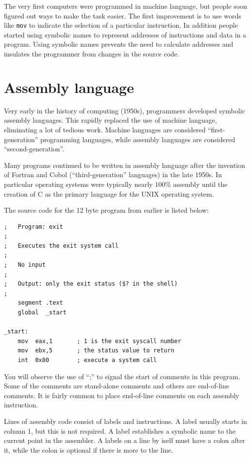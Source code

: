 \documentclass[11pt,b5paper]{book}
\begin{document}
The very first computers were programmed in machine language, but people
soon figured out ways to make the task easier.
The first improvement is to use words like {\tt mov} to indicate the selection of a particular instruction.
In addition people started using symbolic names to represent addresses of instructions and data in a program.
Using symbolic names prevents the need to calculate addresses and insulates the programmer from changes in the source code.

\section{Assembly language}

Very early in the history of computing (1950s), programmers developed symbolic
assembly languages.
This rapidly replaced the use of machine language, eliminating a lot of
tedious work.
Machine languages are considered ``first-generation'' programming languages,
while assembly languages are considered ``second-generation''.

Many programs continued to be written in assembly language after the invention
of Fortran and Cobol (``third-generation'' languages) in the late 1950s.
In particular operating systems were typically nearly 100\% assembly until the
creation of C as the primary language for the UNIX operating system.

The source code for the 12 byte program from earlier is listed below:

\begin{verbatim}
;   Program: exit
;
;   Executes the exit system call
;
;   No input
;
;   Output: only the exit status ($? in the shell)
;
    segment .text
    global  _start

_start:
    mov  eax,1       ; 1 is the exit syscall number
    mov  ebx,5       ; the status value to return
    int  0x80        ; execute a system call
\end{verbatim}

You will observe the use of ``;'' to signal the start of comments  in this
program.
Some of the comments are stand-alone comments and others are end-of-line
comments.
It is fairly common to place end-of-line comments on each assembly
instruction.

Lines of assembly code consist of labels and instructions.
A label usually starts in column 1, but this is not required.
A label establishes a symbolic name to the current point in the assembler.
A labels on a line by iself must have a colon after it, while the colon is
optional if there is more to the line.
\end{document}
